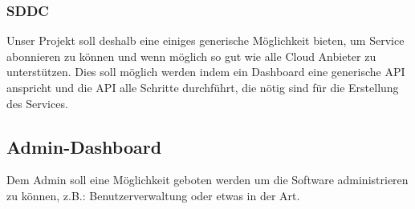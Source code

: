 \documentclass[11pt]{scrartcl}
\begin{document}
\subsubsection{SDDC}
Unser Projekt soll deshalb eine einiges generische Möglichkeit bieten, um 
Service abonnieren zu können und wenn möglich so gut wie alle Cloud Anbieter zu 
unterstützen.
Dies soll möglich werden indem ein Dashboard eine generische API anspricht und 
die API alle Schritte durchführt, die nötig sind für die Erstellung des 
Services.

\subsection{Admin-Dashboard}
Dem Admin soll eine Möglichkeit geboten werden um die Software administrieren zu 
können, z.B.: Benutzerverwaltung oder etwas in der Art.
\end{document}
